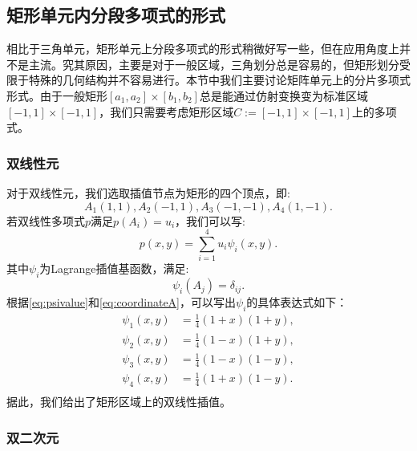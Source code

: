 \subsection{矩形单元内分段多项式的形式}
相比于三角单元，矩形单元上分段多项式的形式稍微好写一些，但在应用角度上并不是主流。究其原因，主要是对于一般区域，三角划分总是容易的，但矩形划分受限于特殊的几何结构并不容易进行。本节中我们主要讨论矩阵单元上的分片多项式形式。由于一般矩形$[a_{1},a_{2}]\times[b_{1},b_{2}]$总是能通过仿射变换变为标准区域$[-1,1]\times[-1,1]$，我们只需要考虑矩形区域$C:=[-1,1]\times[-1,1]$上的多项式。
\subsubsection{双线性元}
对于双线性元，我们选取插值节点为矩形的四个顶点，即:
\begin{equation}
    \label{eq:coordinateA}
    A_{1}(1,1),A_{2}(-1,1),A_{3}(-1,-1),A_{4}(1,-1).
\end{equation}
若双线性多项式$p$满足$p(A_{i})=u_{i}$，我们可以写:
\begin{equation}
    p(x,y)=\sum_{i=1}^{4}u_{i}{\psi}_{i}(x,y).
\end{equation}
其中$\psi_{i}$为Lagrange插值基函数，满足:
\begin{equation}
    \label{eq:psivalue}
    \psi_{i}(A_{j})=\delta_{ij}.
\end{equation}
根据\eqref{eq:psivalue}和\eqref{eq:coordinateA}，可以写出$\psi_{i}$的具体表达式如下：
\begin{equation}
    \label{eq:psiexpression}
    \begin{aligned}
        \psi_{1}(x,y)&=\frac{1}{4}(1+x)(1+y),\\
        \psi_{2}(x,y)&=\frac{1}{4}(1-x)(1+y),\\
        \psi_{3}(x,y)&=\frac{1}{4}(1-x)(1-y),\\
        \psi_{4}(x,y)&=\frac{1}{4}(1+x)(1-y).\\
    \end{aligned}
\end{equation}
据此，我们给出了矩形区域上的双线性插值。
\subsubsection{双二次元}
